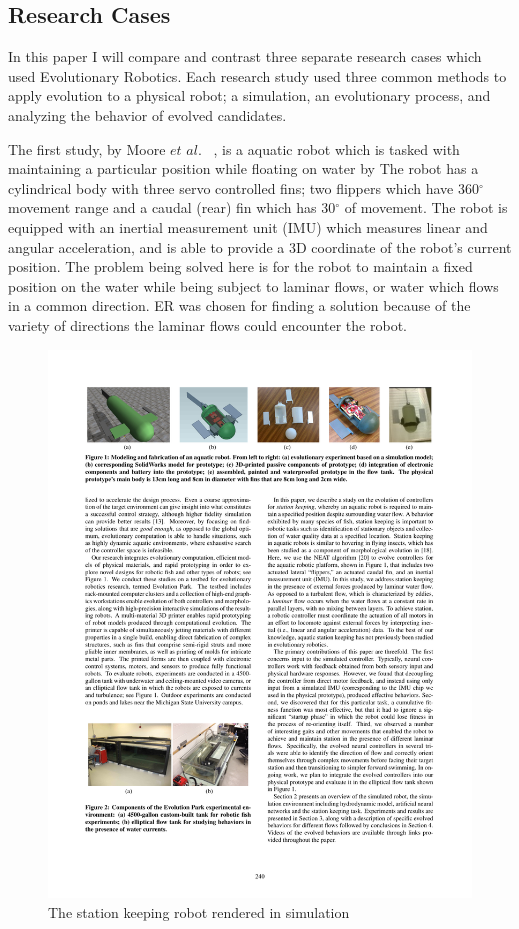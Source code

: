 \documentclass{sig-alternate}
\begin{document}
  
  \subsection{Research Cases}
	In this paper I will compare and contrast three separate research cases which used Evolutionary Robotics. Each research study used three common methods to apply evolution to a physical robot; a simulation, an evolutionary process, and analyzing the behavior of evolved candidates.
	
	The first study, by Moore $et$ $al.$ ~\cite{Moore:2013:ESK:2463372.2463402}, is a aquatic robot which is tasked with maintaining a particular position while floating on water by  The robot has a cylindrical body with three servo controlled fins; two flippers which have 360$^\circ$ movement range and a caudal (rear) fin which has 30$^\circ$ of movement. The robot is equipped with an inertial measurement unit (IMU) which measures linear and angular acceleration, and is able to provide a 3D coordinate of the robot's current position. The problem being solved here is for the robot to maintain a fixed position on the water while being subject to laminar flows, or water which flows in a common direction. ER was chosen for finding a solution because of the variety of directions the laminar flows could encounter the robot.

\begin{figure}%
\center
  \includegraphics[scale=1]{sr2}
\caption{The station keeping robot rendered in simulation}
\label{fig:wRobot}
\end{figure}
\end{document}
